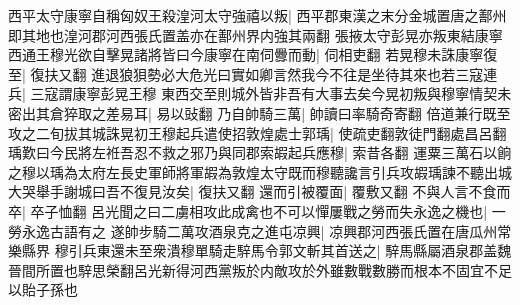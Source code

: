 西平太守康寧自稱匈奴王殺湟河太守強禧以叛|{
	西平郡東漢之末分金城置唐之鄯州即其地也湟河郡河西張氏置盖亦在鄯州界内強其兩翻}
張掖太守彭晃亦叛東結康寧西通王穆光欲自擊晃諸將皆曰今康寧在南伺釁而動|{
	伺相吏翻}
若晃穆未誅康寧復至|{
	復扶又翻}
進退狼狽勢必大危光曰實如卿言然我今不往是坐待其來也若三寇連兵|{
	三寇謂康寧彭晃王穆}
東西交至則城外皆非吾有大事去矣今晃初叛與穆寧情契未密出其倉猝取之差易耳|{
	易以䜴翻}
乃自帥騎三萬|{
	帥讀曰率騎奇寄翻}
倍道兼行既至攻之二旬拔其城誅晃初王穆起兵遣使招敦煌處士郭瑀|{
	使疏吏翻敦徒門翻處昌呂翻}
瑀歎曰今民將左袵吾忍不救之邪乃與同郡索嘏起兵應穆|{
	索昔各翻}
運粟三萬石以餉之穆以瑀為太府左長史軍師將軍嘏為敦煌太守既而穆聽讒言引兵攻嘏瑀諫不聽出城大哭舉手謝城曰吾不復見汝矣|{
	復扶又翻}
還而引被覆面|{
	覆敷又翻}
不與人言不食而卒|{
	卒子恤翻}
呂光聞之曰二虜相攻此成禽也不可以憚屢戰之勞而失永逸之機也|{
	一勞永逸古語有之}
遂帥步騎二萬攻酒泉克之進屯凉興|{
	凉興郡河西張氏置在唐瓜州常樂縣界}
穆引兵東還未至衆潰穆單騎走騂馬令郭文斬其首送之|{
	騂馬縣屬酒泉郡盖魏晉間所置也騂思榮翻呂光新得河西黨叛於内敵攻於外雖數戰數勝而根本不固宜不足以貽子孫也}


